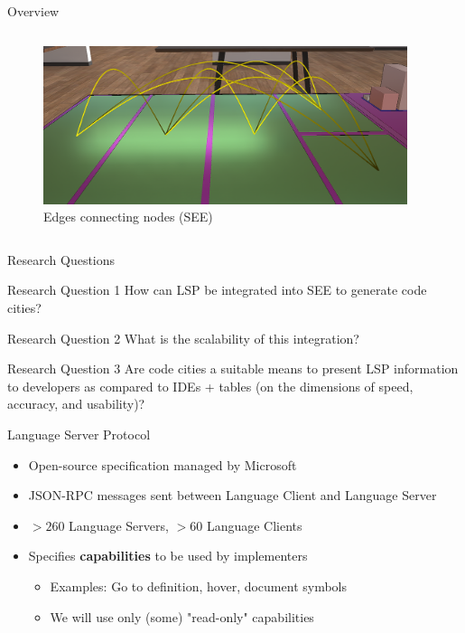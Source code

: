 \documentclass[xcolor={dvipsnames},aspectratio=169,compress,final]{beamer}
\begin{document}
\begin{frame}{Overview}
\begin{columns}
		\begin{figure}
			\begin{center}
				\includegraphics[width=0.95\textwidth,clip,trim={4cm 0 3cm 0}]{figures/SEEEdges}
			\end{center}
			\caption{Edges connecting nodes (SEE)}
		\end{figure}


	\end{columns}

\end{frame}

\begin{frame}{Research Questions}
	\begin{alertblock}{Research Question 1}
		How can LSP be integrated into SEE to generate code cities?
	\end{alertblock}

	\begin{exampleblock}{Research Question 2}
		What is the scalability of this integration?
	\end{exampleblock}

	\begin{block}{Research Question 3}
		Are code cities a suitable means to present LSP information to developers as compared to IDEs + tables (on the dimensions of speed, accuracy, and usability)?
	\end{block}
\end{frame}

\begin{frame}{Language Server Protocol}
	\begin{itemize}
		\item Open-source specification managed by Microsoft
		\item JSON-RPC messages sent between Language Client and Language Server
		\item $>260$ Language Servers, $>60$ Language Clients
		\item Specifies \textbf{capabilities} to be used by implementers
		      \begin{itemize}
			      \item Examples: Go to definition, hover, document symbols
			      \item We will use only (some) "read-only" capabilities
		      \end{itemize}
	\end{itemize}
\end{frame}
%
\end{document}
